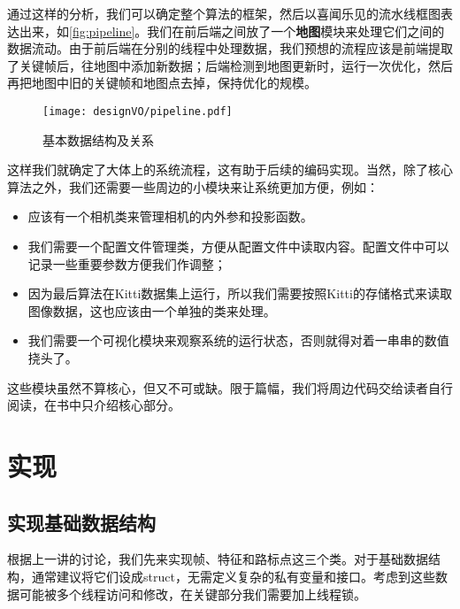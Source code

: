 通过这样的分析，我们可以确定整个算法的框架，然后以喜闻乐见的流水线框图表达出来，如\autoref{fig:pipeline}。我们在前后端之间放了一个\textbf{地图}模块来处理它们之间的数据流动。由于前后端在分别的线程中处理数据，我们预想的流程应该是前端提取了关键帧后，往地图中添加新数据；后端检测到地图更新时，运行一次优化，然后再把地图中旧的关键帧和地图点去掉，保持优化的规模。

\begin{figure}[!htp]
    \centering
    \texttt{[image: designVO/pipeline.pdf]}
    \caption{基本数据结构及关系}
    \label{fig:pipeline}
\end{figure}

这样我们就确定了大体上的系统流程，这有助于后续的编码实现。当然，除了核心算法之外，我们还需要一些周边的小模块来让系统更加方便，例如：

\begin{itemize}
\item 应该有一个相机类来管理相机的内外参和投影函数。
\item 我们需要一个配置文件管理类，方便从配置文件中读取内容。配置文件中可以记录一些重要参数方便我们作调整；
\item 因为最后算法在Kitti数据集上运行，所以我们需要按照Kitti的存储格式来读取图像数据，这也应该由一个单独的类来处理。
\item 我们需要一个可视化模块来观察系统的运行状态，否则就得对着一串串的数值挠头了。
\end{itemize}

这些模块虽然不算核心，但又不可或缺。限于篇幅，我们将周边代码交给读者自行阅读，在书中只介绍核心部分。

\section{实现}
\subsection{实现基础数据结构}
根据上一讲的讨论，我们先来实现帧、特征和路标点这三个类。对于基础数据结构，通常建议将它们设成struct，无需定义复杂的私有变量和接口。考虑到这些数据可能被多个线程访问和修改，在关键部分我们需要加上线程锁。

